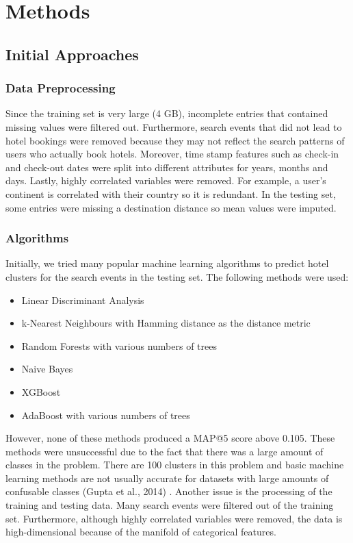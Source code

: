 \documentclass[12pt]{report}
\begin{document}
{\let\clearpage\relax \chapter{Methods}}

\section{Initial Approaches}
\subsection{Data Preprocessing}
Since the training set is very large (4 GB), incomplete entries that contained missing values were filtered out. Furthermore, search events that did not lead to hotel bookings were removed because they may not reflect the search patterns of users who actually book hotels. Moreover, time stamp features such as check-in and check-out dates were split into different attributes for years, months and days. Lastly, highly correlated variables were removed. For example, a user's continent is correlated with their country so it is redundant. In the testing set, some entries were missing a destination distance so mean values were imputed.\\

\subsection{Algorithms}
Initially, we tried many popular machine learning algorithms to predict hotel clusters for the search events in the testing set. The following methods were used: 
\begin{itemize}
\setlength\itemsep{0.1em}
	\item Linear Discriminant Analysis 
	\item k-Nearest Neighbours with Hamming distance as the distance metric 
	\item Random Forests with various numbers of trees 
	\item Naive Bayes 
	\item XGBoost  
	\item AdaBoost with various numbers of trees 
\end{itemize}

However, none of these methods produced a MAP@5 score above 0.105. These methods were unsuccessful due to the fact that there was a large amount of classes in the problem. There are 100 clusters in this problem and basic machine learning methods are not usually accurate for datasets with large amounts of confusable classes (Gupta et al., 2014) . Another issue is the processing of the training and testing data. Many search events were filtered out of the training set. Furthermore, although highly correlated variables were removed, the data is high-dimensional because of the manifold of categorical features.
\end{document}
